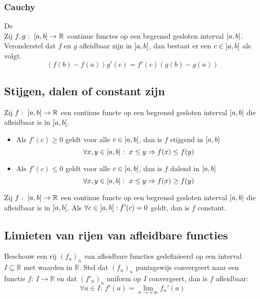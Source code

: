 \documentclass[main.tex]{subfiles}
\begin{document}

\subsubsection{Cauchy}
\label{sec:cauchy}

\begin{st}
  De \\
  Zij $f,g:\ \interval{a}{b} \rightarrow \mathbb{R}$ continue functes op een begrensd gesloten interval $\interval{a}{b}$.
  Veronderstel dat $f$ en $g$ afleidbaar zijn in $\interval[open]{a}{b}$, dan bestaat er een $c\in \interval[open]{a}{b}$ als volgt.
  \[ \left( f(b) - f(a) \right) g'(c) = f'(c) \left( g(b) - g(a) \right) \]
\end{st}

\subsection{Stijgen, dalen of constant zijn}

\begin{pr}
  Zij $f:\ \interval{a}{b} \rightarrow \mathbb{R}$ een continue functe op een begrensd gesloten interval $\interval{a}{b}$ die afleidbaar is in $\interval[open]{a}{b}$.
  \begin{itemize}
  \item Als $f'(c) \ge 0$ geldt voor alle $c \in \interval[open]{a}{b}$, dan is $f$ stijgend in $\interval{a}{b}$
    \[ \forall x,y \in \interval{a}{b}:\ x \le y \Rightarrow f(x) \le f(y) \]
  \item Als $f'(c) \le 0$ geldt voor alle $c \in \interval[open]{a}{b}$, dan is $f$ dalend in $\interval{a}{b}$
    \[ \forall x,y \in \interval{a}{b}:\ x \le y \Rightarrow f(x) \ge f(y) \]
  \end{itemize}
\end{pr}

\begin{pr}
  Zij $f:\ \interval{a}{b} \rightarrow \mathbb{R}$ een continue functe op een begrensd gesloten interval $\interval{a}{b}$ die afleidbaar is in $\interval[open]{a}{b}$.
  Als $\forall c\in \interval[open]{a}{b}: f'(c) = 0$ geldt, dan is $f$ constant.
\end{pr}

\subsection{Limieten van rijen van afleidbare functies}
\label{sec:limieten-van-rijen}

\begin{st}
  Beschouw een rij $(f_{n})_{n}$ van afleidbare functies gedefinieerd op een interval $I \subseteq \mathbb{R}$ met waarden in $\mathbb{R}$.
  Stel dat $(f_{n})_{n}$ puntsgewijs convergeert naar een functie $f:\ I \rightarrow \mathbb{R}$ en dat $(f'_{n})_{n}$ uniform op $I$ convergeert, dan is $f$ afleidbaar:
  \[ \forall a\in I:\ f'(a) = \lim_{n\rightarrow +\infty}f_{n}'(a) \]
\end{st}
\end{document}
